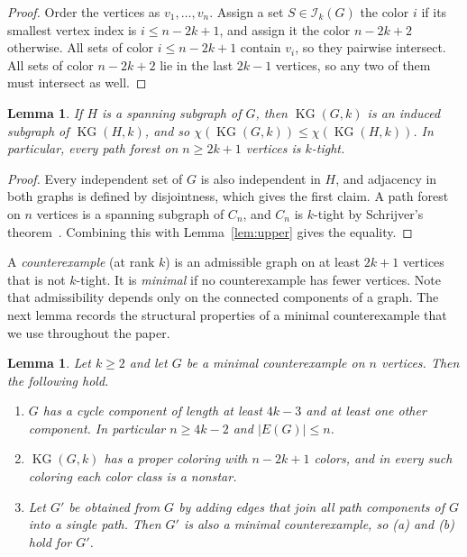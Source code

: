 \documentclass[11pt]{amsart}
\newtheorem{lemma}[theorem]{Lemma}
\theoremstyle{definition}
\theoremstyle{remark}
\numberwithin{equation}{section}
\newcommand{\KG}{\operatorname{KG}}
\begin{document}
\begin{proof}
Order the vertices as $v_1,\dots,v_n$. Assign a set $S\in\mathcal I_k(G)$ the
color $i$ if its smallest vertex index is $i\le n-2k+1$, and assign it the
color $n-2k+2$ otherwise. All sets of color $i\le n-2k+1$ contain $v_i$, so
they pairwise intersect. All sets of color $n-2k+2$ lie in the last $2k-1$
vertices, so any two of them must intersect as well.
\end{proof}

\begin{lemma}\label{lem:spanning}
If $H$ is a spanning subgraph of $G$, then $\KG(G,k)$ is an induced subgraph
of $\KG(H,k)$, and so $\chi(\KG(G,k))\le\chi(\KG(H,k))$. In particular, every
path forest on $n\ge2k+1$ vertices is $k$-tight.
\end{lemma}

\begin{proof}
Every independent set of $G$ is also independent in $H$, and adjacency in both
graphs is defined by disjointness, which gives the first claim. A path forest
on $n$ vertices is a spanning subgraph of $C_n$, and $C_n$ is $k$-tight by
Schrijver's theorem~\cite{Schrijver}. Combining this with Lemma~\ref{lem:upper}
gives the equality.
\end{proof}

A \emph{counterexample} (at rank $k$) is an admissible graph on at least $2k+1$
vertices that is not $k$-tight. It is \emph{minimal} if no counterexample has
fewer vertices. Note that admissibility depends only on the connected
components of a graph. The next lemma records the structural properties of a
minimal counterexample that we use throughout the paper.

\begin{lemma}\label{lem:minimal}
Let $k\ge2$ and let $G$ be a minimal counterexample on $n$ vertices. Then the
following hold.
\begin{enumerate}
\item[(a)] $G$ has a cycle component of length at least $4k-3$ and at least
one other component. In particular $n\ge4k-2$ and $|E(G)|\le n$.
\item[(b)] $\KG(G,k)$ has a proper coloring with $n-2k+1$ colors, and in every
such coloring each color class is a nonstar.
\item[(c)] Let $G'$ be obtained from $G$ by adding edges that join all path
components of $G$ into a single path. Then $G'$ is also a minimal
counterexample, so \textup{(a)} and \textup{(b)} hold for $G'$.
\end{enumerate}
\end{lemma}
\end{document}
